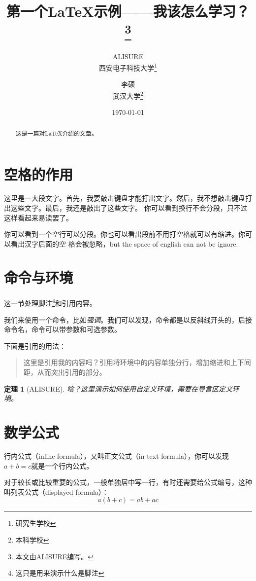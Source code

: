 \documentclass[UTF8]{ctexart}  %
\title{第一个\LaTeX 示例——我该怎么学习？\thanks{本文由ALISURE编写。}}  %
\author{ALISURE\\西安电子科技大学\thanks{研究生学校} \and 李硕\\武汉大学\thanks{本科学校}}  %
\date{\today}  %
\newtheorem{thm}{定理}  %
\begin{document}
	
	\maketitle  %
	
	\tableofcontents  %
	
	\begin{abstract}
		这是一篇对\LaTeX 介绍的文章。
	\end{abstract}
	
	\section{空格的作用}  %
		这里是一大段文字。首先，我要敲击键盘才能打出文字。然后，我不想敲击键盘打出这些文字。最后，我还是敲出了这些文字。
		你可以看到换行不会分段，只不过这样看起来易读罢了。
		
		你可以看到一个空行可以分段。你也可以看出段前不用打空格就可以有缩进。你可以看出汉字后面的空 格会被忽略，but the space of english   can not be  ignore.
		
	\section{命令与环境}  %
		这一节处理脚注\footnote{这只是用来演示什么是脚注}和引用内容。
		
		我们来使用一个命令，比如\emph{强调}。我们可以发现，命令都是以反斜线开头的，后接命令名，命令可以带参数和可选参数。
		
		下面是引用的用法：
		\begin{quote}
			这里是引用我的内容吗？引用将环境中的内容单独分行，增加缩进和上下间距，从而突出引用的部分。
		\end{quote}
		
		\begin{thm}[ALISURE]
			啥？这里演示如何使用自定义环境，需要在导言区定义环境。
		\end{thm}
		
	\section{数学公式}
		行内公式（inline formula），又叫正文公式（in-text formula），你可以发现$a+b=c$就是一个行内公式。
		
		对于较长或比较重要的公式，一般单独居中写一行，有时还需要给公式编号，这种叫列表公式（displayed formula）：
		\begin{equation}
			a(b+c) = ab + ac
		\end{equation}
		
\end{document}
